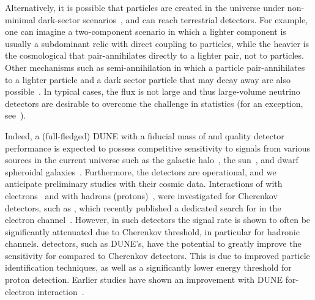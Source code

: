 Alternatively, it is possible that  particles are created in the universe under non-minimal dark-sector scenarios~\cite{Agashe:2014yua,
Belanger:2011ww}, and can reach terrestrial detectors. 
For example, one can imagine a two-component  scenario in which a lighter component is usually a subdominant relic with direct coupling to  particles, while the heavier is the cosmological  that pair-annihilates directly to a lighter  pair, not to  particles. Other mechanisms such as semi-annihilation in which a  particle pair-annihilates to a lighter  particle and a dark sector particle that may decay away are also possible~\cite{Carlson:1992fn, Hochberg:2014dra,Huang:2013xfa,Berger:2014sqa,Kong:2014mia}.
In typical cases, the  flux is not large and thus large-volume neutrino detectors are desirable %
to overcome the challenge in statistics (for an  exception, see~\cite{Cherry:2015oca, Cui:2017ytb}).

Indeed, a (full-fledged) DUNE  with a fiducial mass of \fdfiducialmass and quality detector performance is expected to possess competitive sensitivity to  signals from various sources in the current universe such as the galactic halo~\cite{Agashe:2014yua,
Alhazmi:2016qcs,Kim:2016zjx,Giudice:2017zke,Chatterjee:2018mej,Kim:2018veo}, the sun~\cite{Huang:2013xfa,Berger:2014sqa,Kong:2014mia,Kim:2018veo}, and dwarf spheroidal galaxies~\cite{Necib:2016aez}.
Furthermore, the  detectors %
are operational, and we anticipate preliminary studies with their cosmic data. Interactions of  with electrons~\cite{Agashe:2014yua} 
and with hadrons (protons)~\cite{Berger:2014sqa}, were investigated for Cherenkov detectors, such as \superk, which recently published a dedicated search for  in the electron channel~\cite{Kachulis:2017nci}. However, in such detectors the  signal rate is shown to often be significantly attenuated due to Cherenkov threshold, in particular for hadronic channels.  \lar detectors, such as DUNE's, have the potential to greatly improve the sensitivity for  compared to Cherenkov detectors. This is due to improved particle identification techniques, as well as a significantly lower energy threshold for proton detection. Earlier studies have shown an improvement with DUNE for-electron interaction~\cite{Necib:2016aez}.

